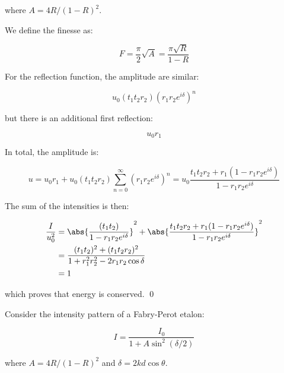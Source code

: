 \documentclass[12pt]{article}
\begin{document}
where $A = 4R/(1 - R)^{2}$.

We define the finesse as:

\begin{equation}
    F = \frac{\pi}{2} \sqrt{A} = \frac{\pi \sqrt{R}}{1 - R}
\end{equation}

For the reflection function, the amplitude are similar:

\begin{equation}
    u_{0} (t_{1} t_{2} r_{2}) (r_{1} r_{2} e^{i \delta})^{n}
\end{equation}

but there is an additional first reflection:

\begin{equation}
    u_{0}r_{1}
\end{equation}

In total, the amplitude is:

\begin{equation}
    u = u_{0} r_{1} + u_{0} (t_{1} t_{2} r_{2}) \sum_{n = 0}^{\infty} (r_{1} r_{2} e^{i \delta})^{n} = u_{0} \frac{t_{1} t_{2} r_{2} + r_{1}(1 - r_{1} r_{2} e^{i \delta})}{1 - r_{1} r_{2} e^{i \delta}}
\end{equation}

The sum of the intensities is then:

\begin{equation}
    \begin{split}
        \frac{I}{u_{0}^{2}} &= \abs{\frac{(t_{1} t_{2})}{1 - r_{1} r_{2} e^{i \delta}}}^{2} + \abs{\frac{t_{1} t_{2} r_{2} + r_{1}(1 - r_{1} r_{2} e^{i \delta})}{1 - r_{1} r_{2} e^{i \delta}}}^{2} \\
        &= \frac{(t_{1} t_{2})^{2} + (t_{1} t_{2} r_{2})^{2}}{1 + r_{1}^{2} r_{2}^{2} - 2 r_{1} r_{2} \cos{\delta}} \\
        &= 1
    \end{split}
\end{equation}

which proves that energy is conserved.
\qed


Consider the intensity pattern of a Fabry-Perot etalon:

\begin{equation}
    I = \frac{I_{0}}{1 + A \sin^{2}{(\delta/2)}}
\end{equation}

where $A = 4R/(1 - R)^{2}$ and $\delta = 2kd \cos{\theta}$.
\end{document}
